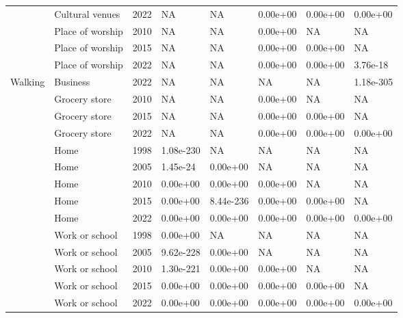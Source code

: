 \documentclass[preprint, 3p,
authoryear]{elsarticle} %
\begin{document}
\begin{table}
{\begin{tabular}[t]{llllllll}
 & Cultural venues & 2022 & NA & NA & 0.00e+00 & 0.00e+00 & 0.00e+00\\

 & Place of worship & 2010 & NA & NA & 0.00e+00 & NA & NA\\

 & Place of worship & 2015 & NA & NA & 0.00e+00 & 0.00e+00 & NA\\

 & Place of worship & 2022 & NA & NA & 0.00e+00 & 0.00e+00 & 3.76e-18\\

\multirow[t]{-34}{*}{\raggedright\arraybackslash Walking} & Business & 2022 & NA & NA & NA & NA & 1.18e-305\\
\cmidrule{1-8}
 & Grocery store & 2010 & NA & NA & 0.00e+00 & NA & NA\\

 & Grocery store & 2015 & NA & NA & 0.00e+00 & 0.00e+00 & NA\\

 & Grocery store & 2022 & NA & NA & 0.00e+00 & 0.00e+00 & 0.00e+00\\

 & Home & 1998 & 1.08e-230 & NA & NA & NA & NA\\

 & Home & 2005 & 1.45e-24 & 0.00e+00 & NA & NA & NA\\

 & Home & 2010 & 0.00e+00 & 0.00e+00 & 0.00e+00 & NA & NA\\

 & Home & 2015 & 0.00e+00 & 8.44e-236 & 0.00e+00 & 0.00e+00 & NA\\

 & Home & 2022 & 0.00e+00 & 0.00e+00 & 0.00e+00 & 0.00e+00 & 0.00e+00\\

 & Work or school & 1998 & 0.00e+00 & NA & NA & NA & NA\\

 & Work or school & 2005 & 9.62e-228 & 0.00e+00 & NA & NA & NA\\

 & Work or school & 2010 & 1.30e-221 & 0.00e+00 & 0.00e+00 & NA & NA\\

 & Work or school & 2015 & 0.00e+00 & 0.00e+00 & 0.00e+00 & 0.00e+00 & NA\\

 & Work or school & 2022 & 0.00e+00 & 0.00e+00 & 0.00e+00 & 0.00e+00 & 0.00e+00\\


\end{tabular}}
\end{table}
\end{document}

